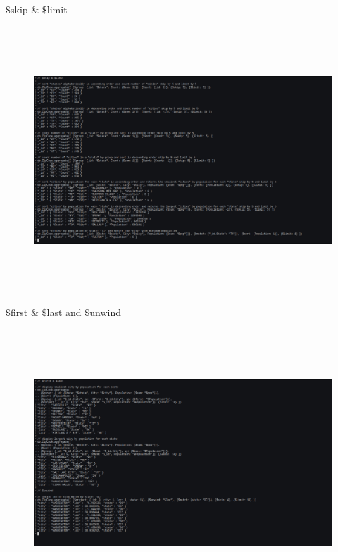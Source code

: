 \documentclass[a4paper,11pt,openright]{report}
\begin{document}
{\footnotesize $\$$skip $\&$ $\$$limit}
\begin{figure}[ht!]
\includegraphics[width=20cm,height=10cm,keepaspectratio]{image7.pdf}
\centering
\end{figure}

\vspace{20px}

{\footnotesize $\$$first $\&$ $\$$last and $\$$unwind}
\begin{figure}[ht!]
\includegraphics[width=20cm,height=10cm,keepaspectratio]{image8.pdf}
\centering
\end{figure}
\end{document}
